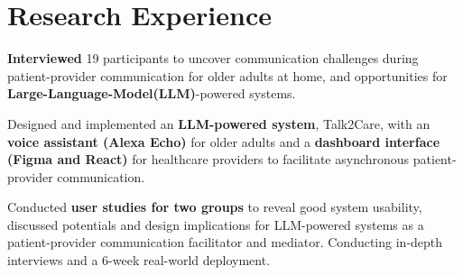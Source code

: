 
\section{\textbf{Research Experience}}
  \resumeSubHeadingListStart
    \vspace{-1.0mm}
      \resumeItemListStart

         \item \textbf{Interviewed} 19 participants to uncover communication challenges during patient-provider communication for older adults at home, and opportunities for \textbf{Large-Language-Model(LLM)}-powered systems.
        \item Designed and implemented an \textbf{LLM-powered system}, Talk2Care,  with an \textbf{voice assistant (Alexa Echo)} for older adults and a \textbf{dashboard interface (Figma and React)} for healthcare providers to facilitate asynchronous patient-provider communication.
        \item Conducted \textbf{user studies for two groups} to reveal good system usability, discussed potentials and design implications for LLM-powered systems as a patient-provider communication facilitator and mediator. Conducting in-depth interviews and a 6-week real-world deployment.
      \resumeItemListEnd


